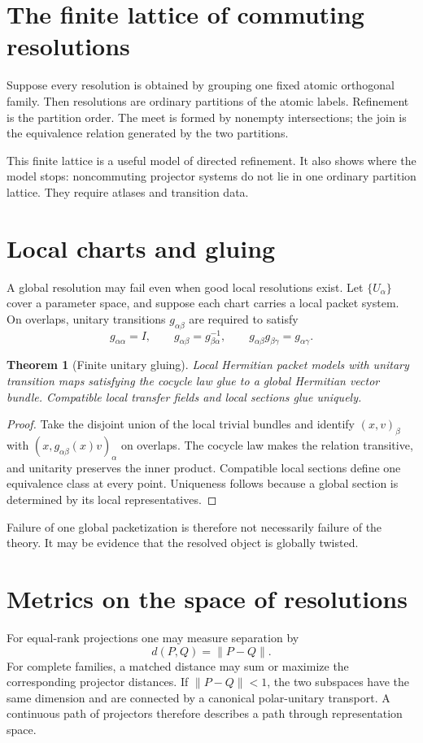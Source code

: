\documentclass[11pt,oneside]{book}
\newtheorem{theorem}[definition]{Theorem}
\theoremstyle{remark}
\begin{document}
\section{The finite lattice of commuting resolutions}
Suppose every resolution is obtained by grouping one fixed atomic orthogonal family.  Then resolutions are ordinary partitions of the atomic labels.  Refinement is the partition order.  The meet is formed by nonempty intersections; the join is the equivalence relation generated by the two partitions.

This finite lattice is a useful model of directed refinement.  It also shows where the model stops: noncommuting projector systems do not lie in one ordinary partition lattice.  They require atlases and transition data.

\section{Local charts and gluing}
A global resolution may fail even when good local resolutions exist.  Let \(\{U_\alpha\}\) cover a parameter space, and suppose each chart carries a local packet system.  On overlaps, unitary transitions \(g_{\alpha\beta}\) are required to satisfy
\[
g_{\alpha\alpha}=I,
\qquad
g_{\alpha\beta}=g_{\beta\alpha}^{-1},
\qquad
g_{\alpha\beta}g_{\beta\gamma}=g_{\alpha\gamma}.
\]

\begin{theorem}[Finite unitary gluing]
Local Hermitian packet models with unitary transition maps satisfying the cocycle law glue to a global Hermitian vector bundle.  Compatible local transfer fields and local sections glue uniquely.
\end{theorem}

\begin{proof}
Take the disjoint union of the local trivial bundles and identify \((x,v)_\beta\) with \((x,g_{\alpha\beta}(x)v)_\alpha\) on overlaps.  The cocycle law makes the relation transitive, and unitarity preserves the inner product.  Compatible local sections define one equivalence class at every point.  Uniqueness follows because a global section is determined by its local representatives.
\end{proof}

Failure of one global packetization is therefore not necessarily failure of the theory.  It may be evidence that the resolved object is globally twisted.

\section{Metrics on the space of resolutions}
For equal-rank projections one may measure separation by
\[
d(P,Q)=\|P-Q\|.
\]
For complete families, a matched distance may sum or maximize the corresponding projector distances.  If \(\|P-Q\|<1\), the two subspaces have the same dimension and are connected by a canonical polar-unitary transport.  A continuous path of projectors therefore describes a path through representation space.
\end{document}
